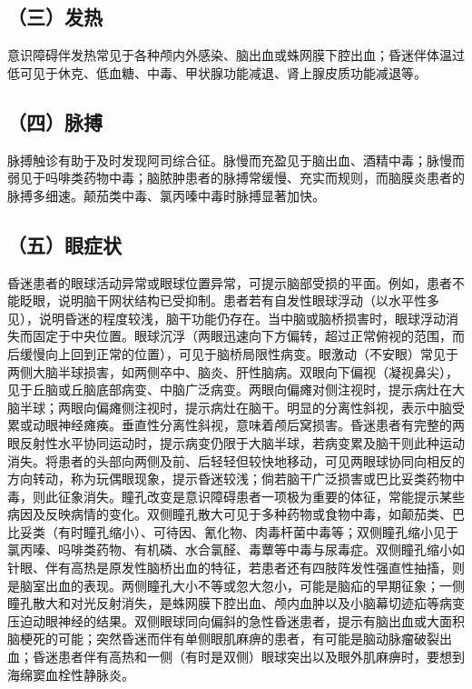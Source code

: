 \subsection{（三）发热}

意识障碍伴发热常见于各种颅内外感染、脑出血或蛛网膜下腔出血；昏迷伴体温过低可见于休克、低血糖、中毒、甲状腺功能减退、肾上腺皮质功能减退等。

\subsection{（四）脉搏}

脉搏触诊有助于及时发现阿司综合征。脉慢而充盈见于脑出血、酒精中毒；脉慢而弱见于吗啡类药物中毒；脑脓肿患者的脉搏常缓慢、充实而规则，而脑膜炎患者的脉搏多细速。颠茄类中毒、氯丙嗪中毒时脉搏显著加快。

\subsection{（五）眼症状}

昏迷患者的眼球活动异常或眼球位置异常，可提示脑部受损的平面。例如，患者不能眨眼，说明脑干网状结构已受抑制。患者若有自发性眼球浮动（以水平性多见），说明昏迷的程度较浅，脑干功能仍存在。当中脑或脑桥损害时，眼球浮动消失而固定于中央位置。眼球沉浮（两眼迅速向下方偏转，超过正常俯视的范围，而后缓慢向上回到正常的位置），可见于脑桥局限性病变。眼激动（不安眼）常见于两侧大脑半球损害，如两侧卒中、脑炎、肝性脑病。双眼向下偏视（凝视鼻尖），见于丘脑或丘脑底部病变、中脑广泛病变。两眼向偏瘫对侧注视时，提示病灶在大脑半球；两眼向偏瘫侧注视时，提示病灶在脑干。明显的分离性斜视，表示中脑受累或动眼神经瘫痪。垂直性分离性斜视，意味着颅后窝损害。昏迷患者有完整的两眼反射性水平协同运动时，提示病变仍限于大脑半球，若病变累及脑干则此种运动消失。将患者的头部向两侧及前、后轻轻但较快地移动，可见两眼球协同向相反的方向转动，称为玩偶眼现象，提示昏迷较浅；倘若脑干广泛损害或巴比妥类药物中毒，则此征象消失。瞳孔改变是意识障碍患者一项极为重要的体征，常能提示某些病因及反映病情的变化。双侧瞳孔散大可见于多种药物或食物中毒，如颠茄类、巴比妥类（有时瞳孔缩小）、可待因、氰化物、肉毒杆菌中毒等；双侧瞳孔缩小见于氯丙嗪、吗啡类药物、有机磷、水合氯醛、毒蕈等中毒与尿毒症。双侧瞳孔缩小如针眼、伴有高热是原发性脑桥出血的特征，若患者还有四肢阵发性强直性抽搐，则是脑室出血的表现。两侧瞳孔大小不等或忽大忽小，可能是脑疝的早期征象；一侧瞳孔散大和对光反射消失，是蛛网膜下腔出血、颅内血肿以及小脑幕切迹疝等病变压迫动眼神经的结果。双侧眼球同向偏斜的急性昏迷患者，提示有脑出血或大面积脑梗死的可能；突然昏迷而伴有单侧眼肌麻痹的患者，有可能是脑动脉瘤破裂出血；昏迷患者伴有高热和一侧（有时是双侧）眼球突出以及眼外肌麻痹时，要想到海绵窦血栓性静脉炎。

